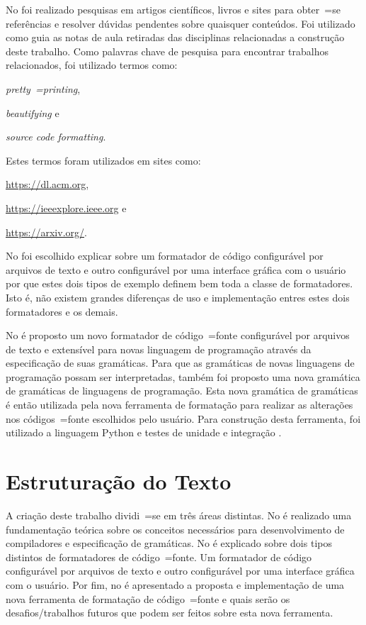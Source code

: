 No  foi realizado pesquisas em artigos científicos,
livros e
sites para obter~=se referências e
resolver dúvidas pendentes sobre quaisquer conteúdos.
Foi utilizado como guia as notas de aula retiradas das disciplinas relacionadas a construção deste trabalho.
Como palavras chave de pesquisa para encontrar trabalhos relacionados,
foi utilizado termos como:
\begin{inparaenum}[1)]
\item \textit{pretty~=printing},
\item \textit{beautifying} e
\item \textit{source code formatting}.
\end{inparaenum}%
Estes termos foram utilizados em sites como:
\begin{inparaenum}[1)]
\item \url{https://dl.acm.org},
\item \url{https://ieeexplore.ieee.org} e
\item \url{https://arxiv.org/}.
\end{inparaenum}%

No  foi escolhido explicar sobre um formatador de código configurável por arquivos de texto e
outro configurável por uma interface gráfica com o usuário por que estes dois tipos de exemplo definem bem toda a classe de formatadores.
Isto é,
não existem grandes diferenças de uso e
implementação entres estes dois formatadores e
os demais.

No  é proposto um novo formatador de código~=fonte configurável por arquivos de texto e
extensível para novas linguagem de programação através da especificação de suas gramáticas.
Para que as gramáticas de novas linguagens de programação possam ser interpretadas,
também foi proposto uma nova gramática de gramáticas de linguagens de programação.
Esta nova gramática de gramáticas é então utilizada pela nova ferramenta de formatação para realizar as alterações nos códigos~=fonte escolhidos pelo usuário.
Para construção desta ferramenta,
foi utilizado a linguagem Python e
testes de unidade e
integração \cite{continuousIntegration}.


\section{Estruturação do Texto}

A criação deste trabalho dividi~=se em três áreas distintas.
No  é realizado uma fundamentação teórica sobre os conceitos necessários para desenvolvimento de compiladores e
especificação de gramáticas.
No  é explicado sobre dois tipos distintos de formatadores de código~=fonte.
Um formatador de código configurável por arquivos de texto e
outro configurável por uma interface gráfica com o usuário.
Por fim,
no  é apresentado a proposta e
implementação de uma nova ferramenta de formatação de código~=fonte e
quais serão os desafios\slash{}trabalhos futuros que podem ser feitos sobre esta nova ferramenta.
